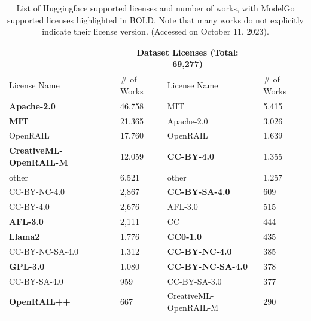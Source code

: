 \begin{table}[]
    \caption{List of Huggingface supported licenses and number of works, with ModelGo supported licenses highlighted in BOLD. Note that many works do not explicitly indicate their license version. (Accessed on October 11, 2023). }
    \footnotesize
    \label{tab:stats}
    \begin{tabular}{|ll||ll|}
    \hline
    \rowcolor[gray]{.8} 
    \multicolumn{2}{|c||}{Model Licenses (Total: 355,150)}     & \multicolumn{2}{c|}{Dataset Licenses (Total: 69,277)}   \\ \hline
    \multicolumn{1}{|l|}{License Name} & \# of Works & \multicolumn{1}{l|}{License Name} & \# of Works \\ \hline
    \multicolumn{1}{|l|}{\textbf{Apache-2.0}} & 46,758 & \multicolumn{1}{l|}{MIT} & 5,415 \\ \hline
    \multicolumn{1}{|l|}{\textbf{MIT}} & 21,365 & \multicolumn{1}{l|}{Apache-2.0} & 3,026 \\ \hline %
    \multicolumn{1}{|l|}{OpenRAIL} & 17,760 & \multicolumn{1}{l|}{OpenRAIL} & 1,639 \\ \hline
    \multicolumn{1}{|l|}{\textbf{CreativeML-OpenRAIL-M}} & 12,059 & \multicolumn{1}{l|}{\textbf{CC-BY-4.0}} & 1,355 \\ \hline
    \multicolumn{1}{|l|}{other} & 6,521 & \multicolumn{1}{l|}{other} & 1,257 \\ \hline
    \multicolumn{1}{|l|}{CC-BY-NC-4.0} & 2,867 & \multicolumn{1}{l|}{\textbf{CC-BY-SA-4.0}} & 609 \\ \hline
    \multicolumn{1}{|l|}{CC-BY-4.0} & 2,676 & \multicolumn{1}{l|}{AFL-3.0} & 515 \\ \hline
    \multicolumn{1}{|l|}{\textbf{AFL-3.0}} & 2,111 & \multicolumn{1}{l|}{CC} & 444 \\ \hline
    \multicolumn{1}{|l|}{\textbf{Llama2}} & 1,776 & \multicolumn{1}{l|}{\textbf{CC0-1.0}} & 435 \\ \hline
    \multicolumn{1}{|l|}{CC-BY-NC-SA-4.0} & 1,312 & \multicolumn{1}{l|}{\textbf{CC-BY-NC-4.0}} & 385 \\ \hline
    \multicolumn{1}{|l|}{\textbf{GPL-3.0}} & 1,080 & \multicolumn{1}{l|}{\textbf{CC-BY-NC-SA-4.0}} & 378 \\ \hline
    \multicolumn{1}{|l|}{CC-BY-SA-4.0} & 959 & \multicolumn{1}{l|}{CC-BY-SA-3.0} & 377 \\ \hline
    \multicolumn{1}{|l|}{\textbf{OpenRAIL++}} & 667 & \multicolumn{1}{l|}{CreativeML-OpenRAIL-M} & 290 \\ \hline

\end{tabular}
\end{table}
